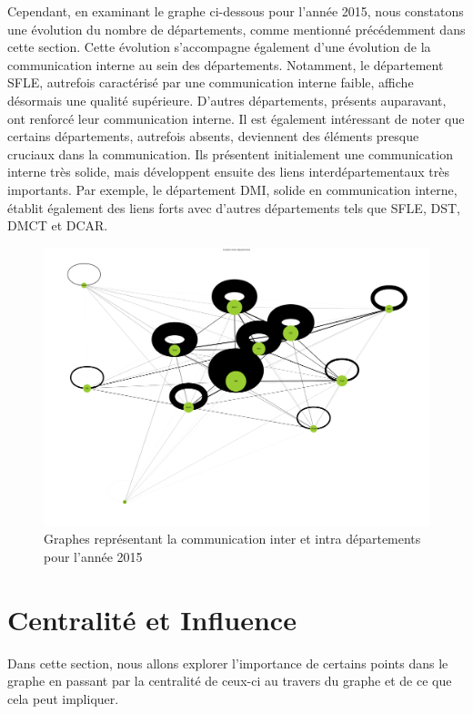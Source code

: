 \documentclass{article}
\begin{document}
Cependant, en examinant le graphe ci-dessous pour l'année 2015, nous constatons une évolution du nombre de départements, comme mentionné précédemment dans cette section. Cette évolution s'accompagne également d'une évolution de la communication interne au sein des départements. Notamment, le département SFLE, autrefois caractérisé par une communication interne faible, affiche désormais une qualité supérieure. D'autres départements, présents auparavant, ont renforcé leur communication interne. Il est également intéressant de noter que certains départements, autrefois absents, deviennent des éléments presque cruciaux dans la communication. Ils présentent initialement une communication interne très solide, mais développent ensuite des liens interdépartementaux très importants. Par exemple, le département DMI, solide en communication interne, établit également des liens forts avec d'autres départements tels que SFLE, DST, DMCT et DCAR.

\begin{figure}[h]
    \centering
    \includegraphics[width=16.4cm]{assets/communaute/communaute_communication_2015.png}
    \caption{Graphes représentant la communication inter et intra départements pour l'année 2015}
    \label{fig:communaute_communication_2015}
\end{figure}


\section{Centralité et Influence}
Dans cette section, nous allons explorer l’importance de certains points dans le graphe en passant par la centralité de ceux-ci au travers du graphe et de ce que cela peut impliquer.
\end{document}
